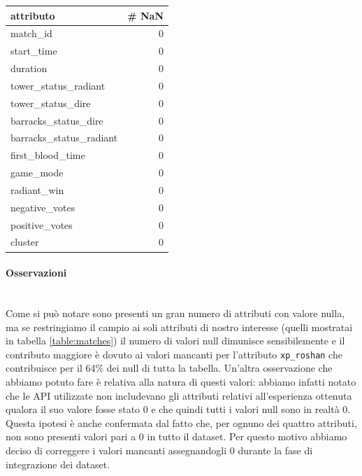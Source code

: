 \documentclass[a4paper,12pt,openany,oneside]{book}
\newcommand{\myparagraph}[1]{\paragraph{#1}\mbox{}\\[0.8em]}
\begin{document}
\begin{table}[H]	
	\centering	
	\begin{tabularx}{0.40\textwidth}{lr} 
		attributo  & \# NaN \\
		\midrule
		match\_id                 &  0 \\
		start\_time               &  0 \\
		duration                 &  0 \\
		tower\_status\_radiant     &  0 \\
		tower\_status\_dire        &  0 \\
		barracks\_status\_dire     &  0 \\
		barracks\_status\_radiant  &  0 \\
		first\_blood\_time         &  0 \\
		game\_mode                &  0 \\
		radiant\_win              &  0 \\
		negative\_votes           &  0 \\
		positive\_votes           &  0 \\
		cluster                  &  0 \\
	\end{tabularx}
\end{table}

\myparagraph{Osservazioni}
Come si può notare sono presenti un gran numero di attributi con valore nulla, ma se restringiamo il campio ai soli attributi di nostro interesse (quelli mostratai in tabella \ref{table:matches}) il numero di valori null dimunisce sensibilemente e il contributo maggiore è dovuto ai valori mancanti per l'attributo \verb|xp_roshan| che contribuisce per il 64\% dei null di tutta la tabella. Un'altra osservazione che abbiamo potuto fare è relativa alla natura di questi valori: abbiamo infatti notato che le API utilizzate non includevano gli attributi relativi all'esperienza ottenuta qualora il suo valore fosse stato 0 e che quindi tutti i valori null sono in realtà 0. Questa ipotesi è anche confermata dal fatto che, per ognuno dei quattro attributi, non sono presenti valori pari a 0 in tutto il dataset. Per questo motivo abbiamo deciso di correggere i valori mancanti assegnandogli 0 durante la fase di integrazione dei dataset.
\end{document}
